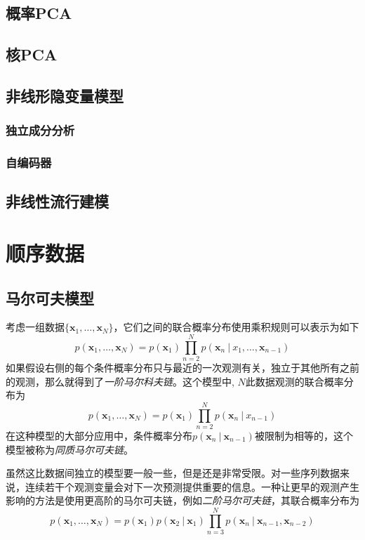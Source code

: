 \documentclass[11pt]{ctexbook}
\begin{document}
\section{概率PCA}
\section{核PCA}
\section{非线形隐变量模型}
\subsection{独立成分分析}
\subsection{自编码器}
\section{非线性流行建模}

\chapter{顺序数据}
\section{马尔可夫模型}
考虑一组数据$\{\bm x_1, \ldots, \bm x_N\}$，它们之间的联合概率分布使用乘积规则可以表示为如下
\begin{equation}
	p(\bm x_1, \ldots, \bm x_N)  = p(\bm x_1)\prod_{n=2}^{N}p(\bm x_n\ |\ x_1, \ldots, \bm x_{n-1})
\end{equation}
如果假设右侧的每个条件概率分布只与最近的一次观测有关，独立于其他所有之前的观测，那么就得到了\emph{一阶马尔科夫链}。这个模型中, $N$此数据观测的联合概率分布为
\begin{equation}
	p(\bm x_1, \ldots, \bm x_N) = p(\bm x_1)\prod_{n=2}^{N}p(\bm x_n\ |\ x_{n-1})
\end{equation}
在这种模型的大部分应用中，条件概率分布$p(\bm x_n\ |\ \bm x_{n-1})$被限制为相等的，这个模型被称为\emph{同质马尔可夫链}。

虽然这比数据间独立的模型要一般一些，但是还是非常受限。对一些序列数据来说，连续若干个观测变量会对下一次预测提供重要的信息。一种让更早的观测产生影响的方法是使用更高阶的马尔可夫链，例如\emph{二阶马尔可夫链}，其联合概率分布为
\begin{equation}
	p(\bm x_1, \ldots, \bm x_N) = p(\bm x_1)p(\bm x_2\ |\ \bm x_1)\prod_{n=3}^{N}p(\bm x_n\ |\ \bm x_{n-1}, \bm x_{n-2})
\end{equation}
\end{document}
